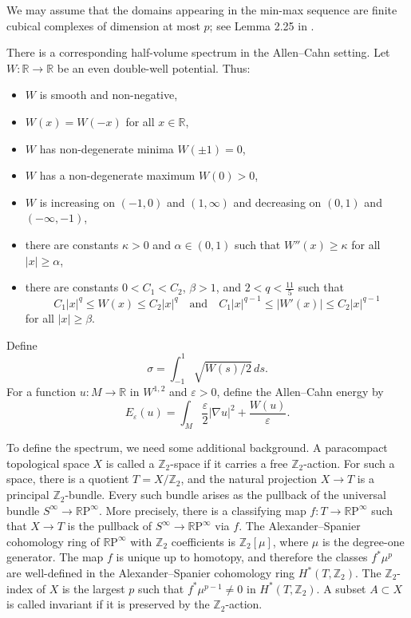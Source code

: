 \documentclass[12pt,english]{article}
\theoremstyle{definition}
\begin{document}
We may assume that the domains appearing in the min-max sequence are finite cubical complexes of dimension at most $p$; see Lemma 2.25 in \cite{Staffa}.

There is a corresponding half-volume spectrum in the Allen--Cahn setting. Let $W: \mathbb{R}\to \mathbb{R}$ be an even double-well potential. Thus:
\begin{itemize}
\item[(i)] $W$ is smooth and non-negative,
\item[(ii)] $W(x) = W(-x)$ for all $x\in \mathbb{R}$,
\item[(iii)] $W$ has non-degenerate minima $W(\pm1)=0$, \label{property(iii)}
\item[(iv)] $W$ has a non-degenerate maximum $W(0)>0$,
\item[(v)] $W$ is increasing on $(-1,0)$ and $(1,\infty)$ and decreasing on $(0,1)$ and $(-\infty,-1)$,
\item[(vi)] there are constants $\kappa > 0$ and $\alpha\in(0,1)$ such that $W''(x) \ge \kappa$ for all $\vert x\vert \ge \alpha$,
\item[(vii)] there are constants $0 < C_1 < C_2$, $\beta > 1$, and $2 < q < \frac{11}{5}$ such that
\[
C_1 \vert x\vert^q \le W(x) \le C_2 \vert x\vert^q
\quad \text{and} \quad
C_1 \vert x\vert^{q-1} \le \vert W'(x)\vert \le C_2 \vert x\vert^{q-1}
\]
for all $\vert x\vert \ge \beta$.
\end{itemize}

Define
\[
\sigma = \int_{-1}^1 \sqrt{W(s)/2}\, ds.
\]
For a function $u: M\to \mathbb{R}$ in $W^{1,2}$ and $\varepsilon > 0$, define the Allen--Cahn energy by
\[
E_\varepsilon(u) = \int_M \frac \varepsilon 2 \vert  \nabla u\vert^2 + \frac{W(u)}{\varepsilon}.
\]

To define the spectrum, we need some additional background. A paracompact topological space $X$ is called a $\mathbb{Z}_2$-space if it carries a free $\mathbb{Z}_2$-action. For such a space, there is a quotient $T = X/\mathbb{Z}_2$, and the natural projection $X\to T$ is a principal $\mathbb{Z}_2$-bundle. Every such bundle arises as the pullback of the universal bundle $S^\infty \to \mathbb{R}\text{P}^\infty$. More precisely, there is a classifying map $f: T\to \mathbb{R}\text{P}^\infty$ such that $X\to T$ is the pullback of $S^\infty \to \mathbb{R}\text{P}^\infty$ via $f$. The Alexander--Spanier cohomology ring of $\mathbb{R}\text{P}^\infty$ with $\mathbb{Z}_2$ coefficients is $\mathbb{Z}_2[\mu]$, where $\mu$ is the degree-one generator. The map $f$ is unique up to homotopy, and therefore the classes $f^*\mu^p$ are well-defined in the Alexander--Spanier cohomology ring $H^*(T,\mathbb{Z}_2)$. The $\mathbb{Z}_2$-index of $X$ is the largest $p$ such that $f^*\mu^{p-1} \neq 0$ in $H^*(T,\mathbb{Z}_2)$. A subset $A\subset X$ is called invariant if it is preserved by the $\mathbb{Z}_2$-action.
\end{document}
